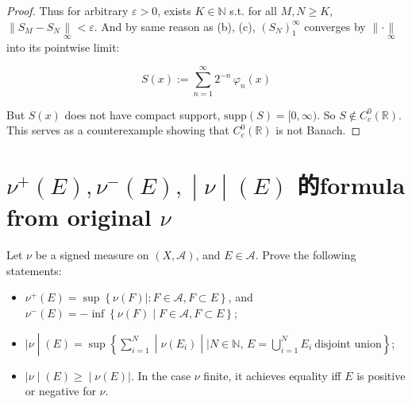 \begin{proof}
Thus for arbitrary \(\varepsilon > 0\), exists \(K \in \mathbb{N}\) s.t. for all \(M,N \geq K\), \(\parallel S_{M} - S_{N}\underset{\infty}{\parallel} < \varepsilon\). And by same reason as (b), (c), \((S_{N})_{1}^{\infty}\) converges by \(\parallel \cdot \underset{\infty}{\parallel}\) into its pointwise limit:

\[S(x) := \sum\limits_{n = 1}^{\infty}2^{- n}\,\varphi_{n}(x)\]

But \(S(x)\) does not have compact support, \(\text{supp}(S) = \lbrack 0,\infty)\). So \(S \notin C_{c}^{0}(\mathbb{R})\). This serves as a counterexample showing that \(C_{c}^{0}(\mathbb{R})\) is not Banach.

\end{proof}

\section{\texorpdfstring{\(\left. \nu^{+}(E),\nu^{-}(E), \middle| \nu \middle| (E) \right.\) 的formula from original \(\nu\)}{\textbackslash left. \textbackslash nu\^{}\{+\}(E),\textbackslash nu\^{}\{-\}(E), \textbackslash middle\textbar{} \textbackslash nu \textbackslash middle\textbar{} (E) \textbackslash right. 的formula from original \textbackslash nu}}\label{nue-nu-enue-ux7684formula-from-original-nu}

Let \(\nu\) be a signed measure on \((X,\mathcal{A})\), and \(E \in \mathcal{A}\). Prove the following statements:

\begin{itemize}
\item
  \(\nu^{+}(E) = \sup\left\{ {\nu(F) \mid :F \in \mathcal{A},F \subset E} \right\}\), and \(\nu^{-}(E) = - \inf\left\{ {\nu(F) \mid F \in \mathcal{A},F \subset E} \right\}\);
\item
  \(\left. |\nu \middle| (E) = \sup\left\{ \sum_{i = 1}^{N} \middle| \nu(E_{i}) \middle| \mid N \in \mathbb{N},\, E = \bigcup_{i = 1}^{N}E_{i}\ \text{disjoint union} \right\} \right.\);
\item
  \(\left. |\nu \middle| (E) \geq \middle| \nu(E)| \right.\). In the case \(\nu\) finite, it achieves equality iff \(E\) is positive or negative for \(\nu\).
\end{itemize}

